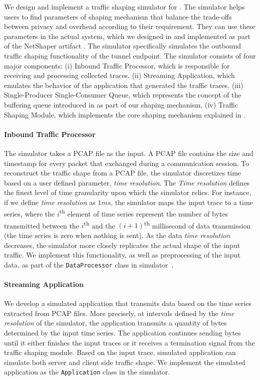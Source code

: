 We design and implement a traffic shaping simulator for {\sys}.
The simulator helps users to find parameters of {\sys} shaping mechanism that balance the trade-offs between privacy and overhead according to their requirement.
They can use these parameters in the actual {\sys} system, which we designed in  and implemented as part of the NetShaper artifact \cite{netshaper_repo}.
The simulator specifically simulates the {outbound traffic shaping} functionality of the tunnel endpoint.
The simulator consists of four major components: (i) Inbound Traffic Processor, which is responsible for receiving and processing collected traces. (ii) Streaming Application, which emulates the behavior of the application that generated the traffic traces. (iii) Single-Producer Single-Consumer Queue, which represents the concept of the buffering queue introduced in  as part of our shaping mechanism. (iv) Traffic Shaping Module, which implements the core shaping mechanism explained in .


\paragraph{Inbound Traffic Processor}\label{subsubsec:design-sim-inbound}
The simulator takes a PCAP file as the input. 
A PCAP file contains the size and timestamp for every packet that exchanged during a communication session.
To reconstruct the traffic shape from a PCAP file, the simulator discretizes time based on a user defined parameter, \emph{time resolution}.
The \emph{Time resolution} defines the finest level of time granularity upon which the simulator relies.
For instance, if we define \emph{time resolution} as $1ms$, the simulator maps the input trace to a time series, where the $i$\textsuperscript{th} element of time series represent the number of bytes transmitted between the $i$\textsuperscript{th} and the $(i+1)$\textsuperscript{th} millisecond of data transmission (the time series is zero when nothing is sent).
As the data \emph{time resolution} decreases, the simulator more closely replicates the actual shape of the input traffic.
We implement this functionality, as well as preprocessing of the input data, as part of the \texttt{DataProcessor} class in simulator~\cite{netshaper_repo}.



\paragraph{Streaming Application}\label{subsubsec:design-simulator-app}
We develop a simulated application that transmits data based on the time series extracted from PCAP files. 
More precisely, at intervals defined by the \emph{time resolution} of the simulator, the application transmits a quantity of bytes determined by the input time series.
The application continues sending bytes until it either finishes the input traces or it receives a termination signal from the traffic shaping module.
Based on the input trace, simulated application can simulate both server and client side traffic shape.
We implement the simulated application as the \texttt{Application} class in the simulator.

